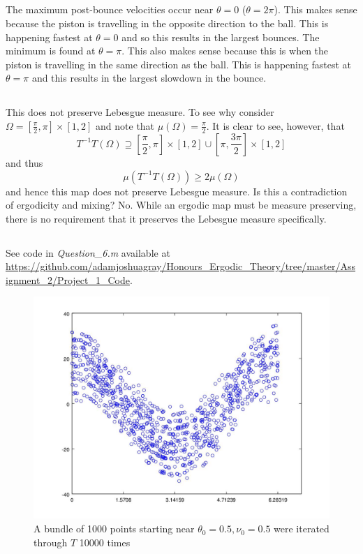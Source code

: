 \documentclass{unswmaths}
\begin{document}
\subsection{}
The maximum post-bounce velocities occur near $ \theta = 0 $ ($\theta = 2\pi$). This makes sense because the piston is travelling in the opposite direction to the ball. This is happening fastest at $ \theta = 0 $ and so this results in the largest bounces. The minimum is found at $ \theta = \pi $. This also makes sense because this is when the piston is travelling in the same direction as the ball. This is happening fastest at $ \theta = \pi $ and this results in the largest slowdown in the bounce.

\subsection{}
This does not preserve Lebesgue measure. To see why consider $ \Omega = [\frac{\pi}{2}, \pi] \times [1,2] $ and note that $ \mu(\Omega) = \frac{\pi}{2} $. It is clear to see, however, that $$ T^{-1}T(\Omega) \supseteq [\frac{\pi}{2},\pi] \times [1,2] \cup [\pi, \frac{3\pi}{2}] \times [1,2]$$ and thus $$ \mu(T^{-1}T(\Omega)) \geq 2 \mu(\Omega) $$ and hence this map does not preserve Lebesgue measure.
Is this a contradiction of ergodicity and mixing? No. While an ergodic map must be measure preserving, there is no requirement that it preserves the Lebesgue measure specifically. 
\subsection{}

See code in \emph{Question\_6.m} available at \url{https://github.com/adamjoshuagray/Honours_Ergodic_Theory/tree/master/Assignment_2/Project_1_Code}.
\label{qn_6_ergodic}
\begin{figure}[h]
    \includegraphics[scale=0.5]{Question_6_Ergodic}
    \caption{A bundle of 1000 points starting near $ \theta_0 = 0.5,  \nu_0 = 0.5 $ were iterated through $  T $ 10000 times}
\end{figure}
\end{document}
